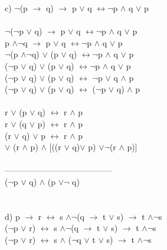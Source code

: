 \documentclass[11pt,letterpaper]{article}
\begin{document}
        \qquad c) $\neg$(p $\rightarrow$ q) $\rightarrow$ p $\vee$ q $\leftrightarrow \neg$p $\wedge$ q $\vee$ p \\ \\
        \qquad $\neg$($\neg$p $\vee$ q) $\rightarrow$ p $\vee$ q $\leftrightarrow \neg$p $\wedge$ q $\vee$ p \\
        \qquad p $\wedge \neg$q $\rightarrow$ p $\vee$ q $\leftrightarrow \neg$p $\wedge$ q $\vee$ p \\
        \qquad $\neg$(p $\wedge \neg$q) $\vee$ (p $\vee$ q) $\leftrightarrow \neg$p $\wedge$ q $\vee$ p \\
        \qquad ($\neg$p $\vee$ q) $\vee$ (p $\vee$ q) $\leftrightarrow \neg$p $\wedge$ q $\vee$ p \\
        \qquad ($\neg$p $\vee$ q) $\vee$ (p $\vee$ q) $\leftrightarrow$ $\neg$p $\vee$ q $\wedge$ p \\
        \qquad ($\neg$p $\vee$ q) $\vee$ (p $\vee$ q) $\leftrightarrow$ ($\neg$p $\vee$ q) $\wedge$ p \\ \\
        \qquad r $\vee$ (p $\vee$ q) $\leftrightarrow$ r $\wedge$ p \\
        \qquad r $\vee$ (q $\vee$ p) $\leftrightarrow$ r $\wedge$ p \\
        \qquad (r $\vee$ q) $\vee$ p $\leftrightarrow$ r $\wedge$ p \\
         $\vee$ (r $\wedge$ p) $\wedge$ [((r $\vee$ q)$\vee$ p) $\vee \neg$(r $\wedge$ p)] \\ \\
        --------------------------------------- \\
        \qquad ($\neg$p $\vee$ q) $\wedge$ (p $\vee \neg$ q)\\ \\ \\
        \qquad d) p $\rightarrow$ r $\leftrightarrow$ s $\wedge \neg$(q $\rightarrow$ t $\vee$ s) $\rightarrow$ t $\wedge \neg$s \\
        \qquad ($\neg$p $\vee$ r) $\leftrightarrow$ s $\wedge \neg$(q $\rightarrow$ t $\vee$ s) $\rightarrow$ t $\wedge \neg$s \\
        \qquad ($\neg$p $\vee$ r) $\leftrightarrow$ s $\wedge$ ($\neg$q $\vee$ t $\vee$ s) $\rightarrow$ t $\wedge \neg$s \\
\end{document}
